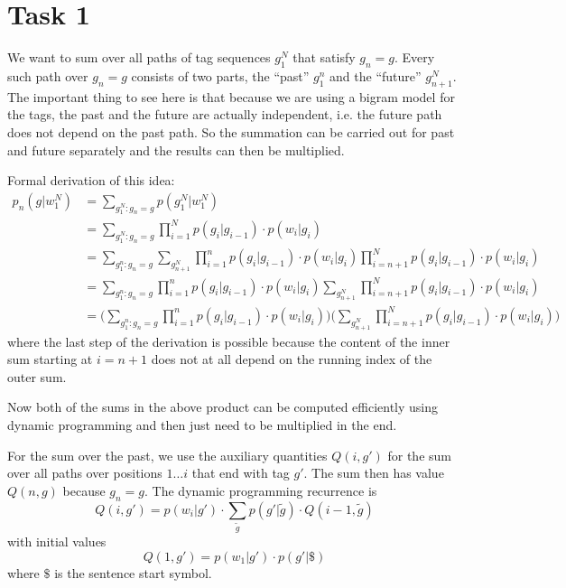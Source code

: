 \documentclass[%
   11pt,              %
   ngerman,           %
   a4paper,           %
   DIV11,             %
]{scrartcl}%
\begin{document}
\section*{Task 1}
We want to sum over all paths of tag sequences $g_1^N$ that satisfy $g_n = g$. Every such path over $g_n = g$ consists of two parts, the ``past'' $g_1^{n}$ and the ``future'' $g_{n+1}^N$. The important thing to see here is that because we are using a bigram model for the tags, the past and the future are actually independent, i.e. the future path does not depend on the past path. So the summation can be carried out for past and future separately and the results can then be multiplied. \par
Formal derivation of this idea:
\begin{align*}
	p_n(g|w_1^N) &= \sum_{g_1^N: g_n = g} p(g_1^N|w_1^N) \\
	&= \sum_{g_1^N: g_n = g} \prod_{i=1}^N p(g_i|g_{i-1}) \cdot p(w_i|g_i) \\
	&= \sum_{g_1^{n}: g_n = g} \sum_{g_{n+1}^N} \prod_{i=1}^n p(g_i|g_{i-1}) \cdot p(w_i|g_i) \prod_{i=n+1}^N p(g_i|g_{i-1}) \cdot p(w_i|g_i)\\
	&= \sum_{g_1^{n}: g_n = g} \prod_{i=1}^n p(g_i|g_{i-1}) \cdot p(w_i|g_i) \sum_{g_{n+1}^N} \prod_{i=n+1}^N p(g_i|g_{i-1}) \cdot p(w_i|g_i)\\
	&= \bigg(\sum_{g_1^{n}: g_n = g} \prod_{i=1}^n p(g_i|g_{i-1}) \cdot p(w_i|g_i)\bigg)\bigg( \sum_{g_{n+1}^N} \prod_{i=n+1}^N p(g_i|g_{i-1}) \cdot p(w_i|g_i)\bigg) 
\end{align*}
where the last step of the derivation is possible because the content of the inner sum starting at $i=n+1$ does not at all depend on the running index of the outer sum. \par
Now both of the sums in the above product can be computed efficiently using dynamic programming and then just need to be multiplied in the end. \par
For the sum over the past, we use the auxiliary quantities $Q(i,g')$ for the sum over all paths over positions $1\ldots i$ that end with tag $g'$. The sum then has value $Q(n,g)$ because $g_n = g$. The dynamic programming recurrence is
\begin{equation*}
	Q(i,g') = p(w_i|g') \cdot \sum_{\tilde{g}} p(g'|\tilde{g}) \cdot Q(i-1,\tilde{g}) 
\end{equation*}
with initial values
\begin{equation*}
	Q(1,g') = p(w_1|g') \cdot p(g'|\$)
\end{equation*}
where $\$ $ is the sentence start symbol. \par
\end{document}
